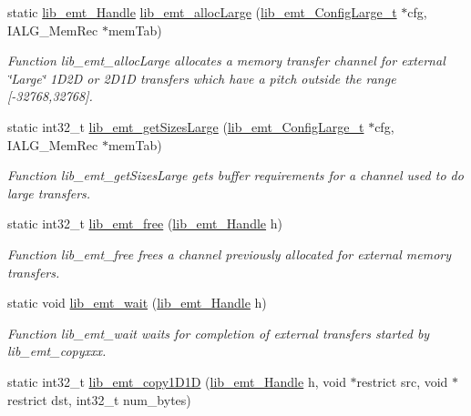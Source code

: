 \begin{DoxyCompactItemize}
static \hyperlink{group__libarch__memtrans_ga3ee110c7c5d95cfe386b113d2d078ec3}{lib\+\_\+emt\+\_\+\+Handle} \hyperlink{group__libarch__memtrans_gad8adc89232fa208dc86267a4885170ed}{lib\+\_\+emt\+\_\+alloc\+Large} (\hyperlink{group__libarch__memtrans_ga437bfecb0c8f550b36bae0f0ee65702d}{lib\+\_\+emt\+\_\+\+Config\+Large\+\_\+t} $\ast$cfg, I\+A\+L\+G\+\_\+\+Mem\+Rec $\ast$mem\+Tab)
\begin{DoxyCompactList}\small\item\em Function lib\+\_\+emt\+\_\+alloc\+Large allocates a memory transfer channel for external \char`\"{}\+Large\char`\"{} 1\+D2\+D or 2\+D1\+D transfers which have a pitch outside the range \mbox{[}-\/32768,32768\mbox{]}. \end{DoxyCompactList}\item 
static int32\+\_\+t \hyperlink{group__libarch__memtrans_ga01f4f02c995d8842a1b172670a97dc80}{lib\+\_\+emt\+\_\+get\+Sizes\+Large} (\hyperlink{group__libarch__memtrans_ga437bfecb0c8f550b36bae0f0ee65702d}{lib\+\_\+emt\+\_\+\+Config\+Large\+\_\+t} $\ast$cfg, I\+A\+L\+G\+\_\+\+Mem\+Rec $\ast$mem\+Tab)
\begin{DoxyCompactList}\small\item\em Function lib\+\_\+emt\+\_\+get\+Sizes\+Large gets buffer requirements for a channel used to do large transfers. \end{DoxyCompactList}\item 
static int32\+\_\+t \hyperlink{group__libarch__memtrans_ga97f5256765c92ada94fed76df35da8f8}{lib\+\_\+emt\+\_\+free} (\hyperlink{group__libarch__memtrans_ga3ee110c7c5d95cfe386b113d2d078ec3}{lib\+\_\+emt\+\_\+\+Handle} h)
\begin{DoxyCompactList}\small\item\em Function lib\+\_\+emt\+\_\+free frees a channel previously allocated for external memory transfers. \end{DoxyCompactList}\item 
static void \hyperlink{group__libarch__memtrans_ga423289d8ae15283e098e41c143b5f512}{lib\+\_\+emt\+\_\+wait} (\hyperlink{group__libarch__memtrans_ga3ee110c7c5d95cfe386b113d2d078ec3}{lib\+\_\+emt\+\_\+\+Handle} h)
\begin{DoxyCompactList}\small\item\em Function lib\+\_\+emt\+\_\+wait waits for completion of external transfers started by lib\+\_\+emt\+\_\+copyxxx. \end{DoxyCompactList}\item 
static int32\+\_\+t \hyperlink{group__libarch__memtrans_gabe9856fed82fa0fc911a9fdb43e494e1}{lib\+\_\+emt\+\_\+copy1\+D1\+D} (\hyperlink{group__libarch__memtrans_ga3ee110c7c5d95cfe386b113d2d078ec3}{lib\+\_\+emt\+\_\+\+Handle} h, void $\ast$restrict src, void $\ast$restrict dst, int32\+\_\+t num\+\_\+bytes)

\end{DoxyCompactItemize}
